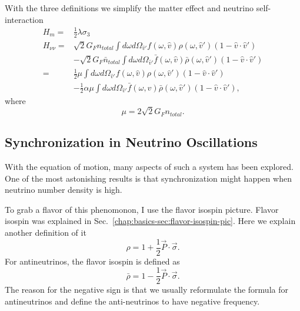 With the three definitions we simplify the matter effect and neutrino self-interaction
\begin{align*}
   H_m =& \frac{1}{2} \lambda \sigma_3 \\
   H_{\nu\nu} =& \sqrt{2}G_F n_{total} \int d\omega d\Omega_{\hat v'} f(\omega,\hat v)\rho(\omega,\hat v') (1-\hat v \cdot \hat v') \\
   & - \sqrt{2}G_F \bar n_{total} \int d\omega d\Omega_{\hat v'} \bar f(\omega,\hat v)\bar\rho(\omega,\hat v') (1-\hat v \cdot \hat v') \\
   =& \frac{1}{2}\mu \int d\omega d\Omega_{\hat v'} f(\omega, \hat v)\rho(\omega,\hat v') (1-\hat v \cdot \hat v') \\
   & - \frac{1}{2}\alpha \mu \int d\omega d\Omega_{\hat v'} \bar f(\omega, \hat v)\bar\rho(\omega,\hat v') (1-\hat v \cdot \hat v') ,
\end{align*}
where
\begin{equation}
   \mu = 2\sqrt{2} G_F n_{total}. 
\end{equation}
   



\subsection{Synchronization in Neutrino Oscillations}


With the equation of motion, many aspects of such a system has been explored. One of the most astonishing results is that synchronization might happen when neutrino number density is high.

To grab a flavor of this phenomonon, I use the flavor isospin picture. Flavor isospin was explained in Sec.~\ref{chap:basics-sec:flavor-isospin-pic}. Here we explain another definition of it
\begin{equation}
   \rho = 1 + \frac{1}{2}\vec P \cdot \vec \sigma. 
\end{equation}
For antineutrinos, the flavor isospin is defined as
\begin{equation}
    \bar\rho = 1 - \frac{1}{2} \vec P \cdot \vec \sigma.
\end{equation}
The reason for the negative sign is that we usually reformulate the formula for antineutrinos and define the anti-neutrinos to have negative frequency.



